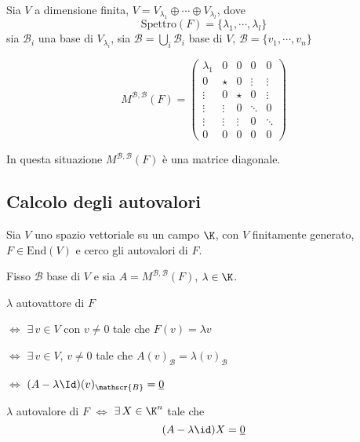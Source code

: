 
Sia $ V $ a dimensione finita, $ V=V_{\lambda_1}\oplus\cdots\oplus V_{\lambda_{l} }   $, dove \[\text{Spettro}(F)=\{\lambda_1, \cdots, \lambda_{l} \}\] sia $ \mathscr{B}_i$ una base di $ V_{\lambda_{i} }  $, sia $ \mathscr{B}=\bigcup_{i} \mathscr{B}_i  $ base di $ V $, $ \mathscr{B}=\{v_1, \cdots, v_{n} \} $

\[
    M^{ \mathscr{B}, \mathscr{B}}(F)=\begin{pmatrix}
        \lambda_1 & 0 & 0 & 0 & 0\\
        0 & \star & 0 & \vdots & \vdots\\
        \vdots & 0 & \star & 0 & \vdots\\
        \vdots & \vdots & 0 & \ddots & 0\\
        \vdots & \vdots & \vdots & 0 & \ddots\\
        0 & 0 & 0 & 0 & 0
    \end{pmatrix}
\]

In questa situazione $ M^{ \mathscr{B}, \mathscr{B}}(F) $ è una matrice diagonale.

\subsection{Calcolo degli autovalori}

Sia $ V $ uno spazio vettoriale su un campo $ \K $, con $ V $ finitamente generato, $ F \in \text{End}(V) $ e cerco gli autovalori di $ F $.

Fisso $ \mathscr{B} $ base di $ V  $ e sia $ A = M^{ \mathscr{B}, \mathscr{B}}(F)$, $\lambda \in \K$. 

$\lambda$ autovattore di $ F $ 

$ \iff $ $ \exists\, v \in V $ con $ v \neq 0 $ tale che $ F(v)=\lambda v $ 

$ \iff $ $ \exists\, v \in V $, $ v \neq 0 $ tale che $ A(v)_{ \mathscr{B}}= \lambda (v)_{ \mathscr{B}} $

$ \iff $ $ (A- \lambda \Id)(v)_{ \mathscr{B}}=\underline{0} $

$ \lambda $ autovalore di $ F $ $ \iff $ $ \exists\,X \in \K^{n} $ tale che \[
    (A-\lambda\id)X=\underline{0}
\]

